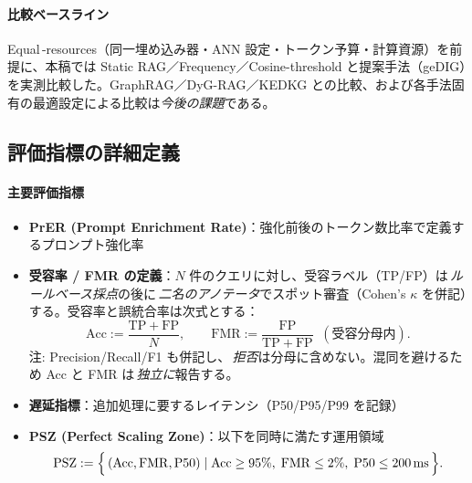 \documentclass[ja=standard,xelatex]{bxjsarticle}
\begin{document}
\paragraph{比較ベースライン}
Equal\,\mbox{-}resources（同一埋め込み器・ANN 設定・トークン予算・計算資源）を前提に、本稿では Static RAG／Frequency／Cosine-threshold と提案手法（geDIG）を実測比較した。GraphRAG\cite{graphrag2024}／DyG-RAG\cite{dygrag2024}／KEDKG\cite{kedkg2024} との比較、および各手法固有の最適設定による比較は\emph{今後の課題}である。

\subsection{評価指標の詳細定義}

\paragraph{主要評価指標}
\begin{itemize}
  \item \textbf{PrER (Prompt Enrichment Rate)}：強化前後のトークン数比率で定義するプロンプト強化率
  \item \textbf{受容率 / FMR の定義}：$N$ 件のクエリに対し、受容ラベル（TP/FP）は\,\emph{ルールベース採点}の後に\,\emph{二名のアノテータ}でスポット審査（Cohen's $\kappa$ を併記）する。受容率と誤統合率は次式とする：
  \begin{equation}
    \mathrm{Acc} := \frac{\mathrm{TP}+\mathrm{FP}}{N},\qquad
    \mathrm{FMR} := \frac{\mathrm{FP}}{\mathrm{TP}+\mathrm{FP}}\;\; (\text{受容分母内}).
  \end{equation}
  \noindent 注: Precision/Recall/F1 も併記し、\,\emph{拒否}は分母に含めない。混同を避けるため Acc と FMR は\,\emph{独立に}報告する。
  \item \textbf{遅延指標}：追加処理に要するレイテンシ（P50/P95/P99 を記録）
  \item \textbf{PSZ (Perfect Scaling Zone)}：以下を同時に満たす運用領域
  \begin{equation}
    \text{PSZ} := \Bigl\{\,(\mathrm{Acc},\mathrm{FMR},\mathrm{P50}) \mid \mathrm{Acc}\ge 95\%,\; \mathrm{FMR}\le 2\%,\; \mathrm{P50}\le \SI{200}{ms}\,\Bigr\}.
  \end{equation}
\end{itemize}
\end{document}
